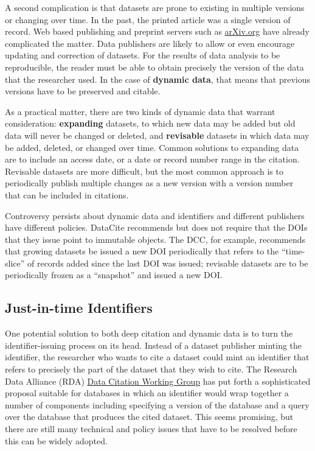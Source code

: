 \documentclass[10pt,twocolumn]{article}
\begin{document}
A second complication is that datasets are prone to existing in multiple versions or changing over time. 
In the past, the printed article was a single version of record.
Web based publishing and preprint servers such as \href{http://arxiv.org/}{arXiv.org} have already complicated the matter. 
Data publishers are likely to allow or even encourage updating and correction of datasets. 
For the results of data analysis to be reproducible, the reader must be able to obtain precisely the version of the data that the researcher used. 
In the case of \textbf{dynamic data}, that means that previous versions have to be preserved and citable.

As a practical matter, there are two kinds of dynamic data that warrant consideration: \textbf{expanding} datasets, to which new data may be added but old data will never be changed or deleted, and \textbf{revisable} datasets in which data may be added, deleted, or changed over time. 
Common solutions to expanding data are to include an access date, or a date or record number range in the citation. 
Revisable datasets are more difficult, but the most common approach is to periodically publish multiple changes as a new version with a version number that can be included in citations.

Controversy persists about dynamic data and identifiers and different publishers have different policies. 
DataCite recommends but does not require that the DOIs that they issue point to immutable objects. 
The DCC, for example, recommends that growing datasets be issued a new DOI periodically that refers to the ``time-slice'' of records added since the last DOI was issued; revisable datasets are to be periodically frozen as a ``snapshot'' and issued a new DOI.

\subsection*{Just-in-time Identifiers}\label{just-in-time-identifiers}

One potential solution to both deep citation and dynamic data is to turn the identifier-issuing process on its head. 
Instead of a dataset publisher minting the identifier, the researcher who wants to cite a dataset could mint an identifier that refers to precisely the part of the dataset that they wish to cite. 
The Research Data Alliance (RDA) \href{http://rd-alliance.org/working-groups/data-citation-wg.html}{Data Citation Working Group} has put forth a sophisticated proposal suitable for databases in which an identifier would wrap together a number of components including specifying a version of the database and a query over the database that produces the cited dataset. 
This seems promising, but there are still many technical and policy issues that have to be resolved before this can be widely adopted.
\end{document}
